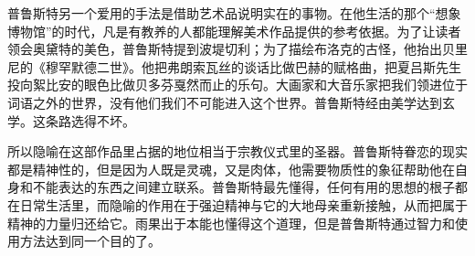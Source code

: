 \par 普鲁斯特另一个爱用的手法是借助艺术品说明实在的事物。在他生活的那个“想象博物馆”的时代，凡是有教养的人都能理解美术作品提供的参考依据。为了让读者领会奥黛特的美色，普鲁斯特提到波堤切利；为了描绘布洛克的古怪，他抬出贝里尼的《穆罕默德二世》。他把弗朗索瓦丝的谈话比做巴赫的赋格曲，把夏吕斯先生投向絮比安的眼色比做贝多芬戛然而止的乐句。大画家和大音乐家把我们领进位于词语之外的世界，没有他们我们不可能进入这个世界。普鲁斯特经由美学达到玄学。这条路选得不坏。
\par 所以隐喻在这部作品里占据的地位相当于宗教仪式里的圣器。普鲁斯特眷恋的现实都是精神性的，但是因为人既是灵魂，又是肉体，他需要物质性的象征帮助他在自身和不能表达的东西之间建立联系。普鲁斯特最先懂得，任何有用的思想的根子都在日常生活里，而隐喻的作用在于强迫精神与它的大地母亲重新接触，从而把属于精神的力量归还给它。雨果出于本能也懂得这个道理，但是普鲁斯特通过智力和使用方法达到同一个目的了。
